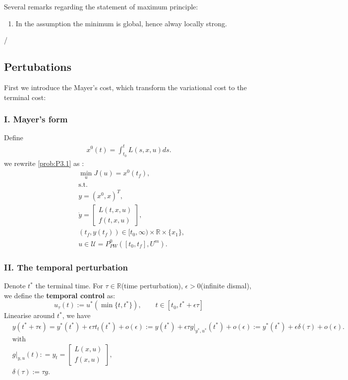 Several remarks regarding the statement of maximum principle:
\begin{enumerate}
	\item In the assumption the minimum is global, hence alway locally strong. 
\end{enumerate}
/

\subsection{Pertubations}
First we introduce the Mayer's cost, which transform the variational cost to the terminal cost:
\subsubsection{I. Mayer's form}
Define
\begin{align*}
	x^0(t) = \int_{t_0}^t L(s, x, u) ds.
\end{align*}
we rewrite \eqref{prob:P3.1} as : 
\begin{equation}
\begin{aligned}
	& \min_u J (u) = x^0(t_f),\\
	& \text{s.t.}\\
	& y = (x^0, x)^T,\\
	& \dot{y} = 
		\begin{bmatrix}
		L(t, x, u) \\
		f(t, x, u)
		\end{bmatrix},\\
	& (t_f, y(t_f)) \in [t_0, \infty) \times \mathbb{R} \times \{x_1\}, \\
	& u \in \mathcal{U} = P^0_{PW}([t_0, t_f], U^m).
\end{aligned}
\end{equation}


\subsubsection{II. The temporal perturbation}
Denote $t^*$ the terminal time. For $\tau \in \mathbb{R}$(time perturbation), $\epsilon > 0$(infinite dismal), we define the \textbf{temporal control} as:
\begin{equation}
u_\tau(t):= u^* (\min\{t, t^* \}), \qquad t \in [t_0, t^* + \epsilon \tau]
\end{equation}
Linearise around $t^*$, we have
\begin{align*}
	&y(t^* + \tau\epsilon) = y^*(t^*) + \epsilon \tau t_t(t^*) + o(\epsilon) := y(t^*) + \epsilon \tau  g|_{y^*, u^*}(t^*) + o(\epsilon) := y^*(t^*) + \epsilon \delta(\tau) + o(\epsilon). \\
	&\text{with }\\
	& g|_{y, u}(t): = y_t = 
	\begin{bmatrix}
		L(x, u)\\
		f(x, u)
	\end{bmatrix},\\
	&\delta(\tau):= \tau g. \\
\end{align*}


